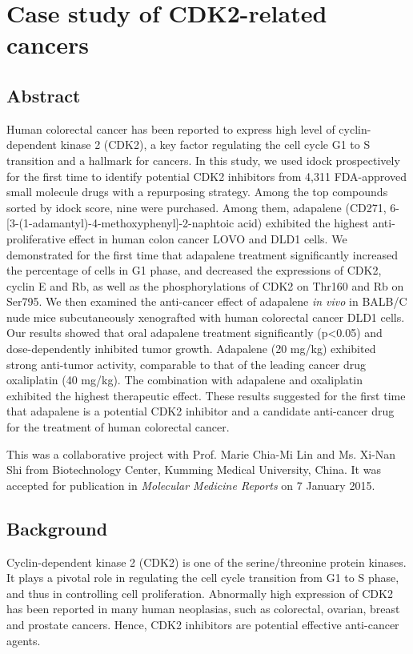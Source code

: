 \chapter{Case study of CDK2-related cancers}
\label{cdk2}

\section{Abstract}

Human colorectal cancer has been reported to express high level of cyclin-dependent kinase 2 (CDK2), a key factor regulating the cell cycle G1 to S transition and a hallmark for cancers. In this study, we used idock prospectively for the first time to identify potential CDK2 inhibitors from 4,311 FDA-approved small molecule drugs with a repurposing strategy. Among the top compounds sorted by idock score, nine were purchased. Among them, adapalene (CD271, 6-[3-(1-adamantyl)-4-methoxyphenyl]-2-naphtoic acid) exhibited the highest anti-proliferative effect in human colon cancer LOVO and DLD1 cells. We demonstrated for the first time that adapalene treatment significantly increased the percentage of cells in G1 phase, and decreased the expressions of CDK2, cyclin E and Rb, as well as the phosphorylations of CDK2 on Thr160 and Rb on Ser795. We then examined the anti-cancer effect of adapalene \textit{in vivo} in BALB/C nude mice subcutaneously xenografted with human colorectal cancer DLD1 cells. Our results showed that oral adapalene treatment significantly (p<0.05) and dose-dependently inhibited tumor growth. Adapalene (20 mg/kg) exhibited strong anti-tumor activity, comparable to that of the leading cancer drug oxaliplatin (40 mg/kg). The combination with adapalene and oxaliplatin exhibited the highest therapeutic effect. These results suggested for the first time that adapalene is a potential CDK2 inhibitor and a candidate anti-cancer drug for the treatment of human colorectal cancer.

This was a collaborative project with Prof. Marie Chia-Mi Lin and Ms. Xi-Nan Shi from Biotechnology Center, Kumming Medical University, China. It was accepted for publication in \textit{Molecular Medicine Reports} on 7 January 2015.

\section{Background}

Cyclin-dependent kinase 2 (CDK2) is one of the serine/threonine protein kinases. It plays a pivotal role in regulating the cell cycle transition from G1 to S phase, and thus in controlling cell proliferation. Abnormally high expression of CDK2 has been reported in many human neoplasias, such as colorectal, ovarian, breast and prostate cancers. Hence, CDK2 inhibitors are potential effective anti-cancer agents.

